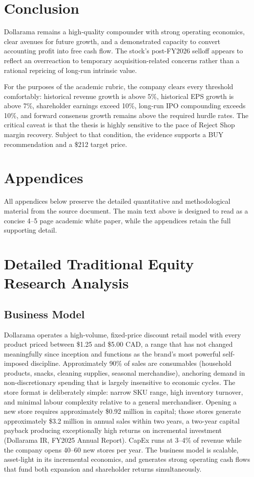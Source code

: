 \documentclass[11pt]{article}
\begin{document}
\section{Conclusion}
Dollarama remains a high-quality compounder with strong operating economics, clear avenues for future growth, and a demonstrated capacity to convert accounting profit into free cash flow. The stock's post-FY2026 selloff appears to reflect an overreaction to temporary acquisition-related concerns rather than a rational repricing of long-run intrinsic value.

For the purposes of the academic rubric, the company clears every threshold comfortably: historical revenue growth is above 5\%, historical EPS growth is above 7\%, shareholder earnings exceed 10\%, long-run IPO compounding exceeds 10\%, and forward consensus growth remains above the required hurdle rates. The critical caveat is that the thesis is highly sensitive to the pace of Reject Shop margin recovery. Subject to that condition, the evidence supports a BUY recommendation and a \$212 target price.


\newpage
\appendix
\section*{Appendices}
All appendices below preserve the detailed quantitative and methodological material from the source document. The main text above is designed to read as a concise 4--5 page academic white paper, while the appendices retain the full supporting detail.



\section{Detailed Traditional Equity Research Analysis}
\subsection{Business Model}
Dollarama operates a high-volume, fixed-price discount retail model with every product priced between \$1.25 and \$5.00 CAD, a range that has not changed meaningfully since inception and functions as the brand's most powerful self-imposed discipline. Approximately 90\% of sales are consumables (household products, snacks, cleaning supplies, seasonal merchandise), anchoring demand in non-discretionary spending that is largely insensitive to economic cycles. The store format is deliberately simple: narrow SKU range, high inventory turnover, and minimal labour complexity relative to a general merchandiser. Opening a new store requires approximately \$0.92 million in capital; those stores generate approximately \$3.2 million in annual sales within two years, a two-year capital payback producing exceptionally high returns on incremental investment (Dollarama IR, FY2025 Annual Report). CapEx runs at 3--4\% of revenue while the company opens 40--60 new stores per year. The business model is scalable, asset-light in its incremental economics, and generates strong operating cash flows that fund both expansion and shareholder returns simultaneously.
\end{document}
